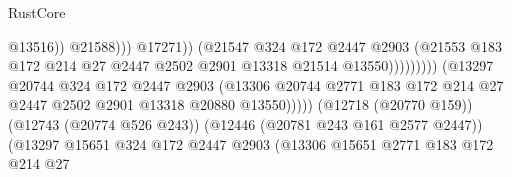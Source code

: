 \begin{lexlean}{RustCore}
\begin{coremodule}
                                                              @13516))
                                                          @21588)))
                                                    @17271))
                                                (@21547
                                                  @324
                                                  @172
                                                  @2447
                                                  @2903
                                                  (@21553
                                                    @183
                                                    @172
                                                    @214
                                                    @27
                                                    @2447
                                                    @2502
                                                    @2901
                                                    @13318
                                                    @21514
                                                    @13550)))))))))
                                  (@13297
                                    @20744
                                    @324
                                    @172
                                    @2447
                                    @2903
                                    (@13306
                                      @20744
                                      @2771
                                      @183
                                      @172
                                      @214
                                      @27
                                      @2447
                                      @2502
                                      @2901
                                      @13318
                                      @20880
                                      @13550)))))
                            (@12718 (@20770 @159))
                            (@12743 (@20774 @526 @243))
                            (@12446 (@20781 @243 @161 @2577 @2447))
                            (@13297
                              @15651
                              @324
                              @172
                              @2447
                              @2903
                              (@13306
                                @15651
                                @2771
                                @183
                                @172
                                @214
                                @27

\end{coremodule}
\end{lexlean}
